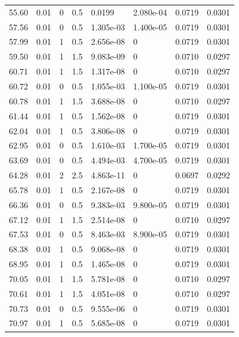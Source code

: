 \documentclass[preview]{standalone}
\begin{document}
{{{\begin{tabular}{L{1.2cm}C{1.2cm} C{0.3cm}C{0.5cm} C{1.4cm}C{1.4cm} C{1.4cm}C{1.4cm}}
  55.60  &  0.01  & 0     & 0.5 &  0.0199  & 2.080e-04  & 0.0719 &  0.0301   \\ 
  57.56  &  0.01  & 0     & 0.5 &  1.305e-03  & 1.400e-05  & 0.0719 &  0.0301   \\ 
  57.99  &  0.01  & 1     & 0.5 &  2.656e-08  & 0  & 0.0719 &  0.0301   \\ 
  59.50  &  0.01  & 1     & 1.5 &  9.083e-09  & 0  & 0.0710 &  0.0297   \\ 
  60.71  &  0.01  & 1     & 1.5 &  1.317e-08  & 0  & 0.0710 &  0.0297   \\ 
  60.72  &  0.01  & 0     & 0.5 &  1.055e-03  & 1.100e-05  & 0.0719 &  0.0301   \\ 
  60.78  &  0.01  & 1     & 1.5 &  3.688e-08  & 0  & 0.0710 &  0.0297   \\ 
  61.44  &  0.01  & 1     & 0.5 &  1.562e-08  & 0  & 0.0719 &  0.0301   \\ 
  62.04  &  0.01  & 1     & 0.5 &  3.806e-08  & 0  & 0.0719 &  0.0301   \\ 
  62.95  &  0.01  & 0     & 0.5 &  1.610e-03  & 1.700e-05  & 0.0719 &  0.0301   \\ 
  63.69  &  0.01  & 0     & 0.5 &  4.494e-03  & 4.700e-05  & 0.0719 &  0.0301   \\ 
  64.28  &  0.01  & 2     & 2.5 &  4.863e-11  & 0  & 0.0697 &  0.0292   \\ 
  65.78  &  0.01  & 1     & 0.5 &  2.167e-08  & 0  & 0.0719 &  0.0301   \\ 
  66.36  &  0.01  & 0     & 0.5 &  9.383e-03  & 9.800e-05  & 0.0719 &  0.0301   \\ 
  67.12  &  0.01  & 1     & 1.5 &  2.514e-08  & 0  & 0.0710 &  0.0297   \\ 
  67.53  &  0.01  & 0     & 0.5 &  8.463e-03  & 8.900e-05  & 0.0719 &  0.0301   \\ 
  68.38  &  0.01  & 1     & 0.5 &  9.068e-08  & 0  & 0.0719 &  0.0301   \\ 
  68.95  &  0.01  & 1     & 0.5 &  1.465e-08  & 0  & 0.0719 &  0.0301   \\ 
  70.05  &  0.01  & 1     & 1.5 &  5.781e-08  & 0  & 0.0710 &  0.0297   \\ 
  70.61  &  0.01  & 1     & 1.5 &  4.051e-08  & 0  & 0.0710 &  0.0297   \\ 
  70.73  &  0.01  & 0     & 0.5 &  9.555e-06  & 0  & 0.0719 &  0.0301   \\ 
  70.97  &  0.01  & 1     & 0.5 &  5.685e-08  & 0  & 0.0719 &  0.0301   \\ 

\end{tabular}}}}
\end{document}
